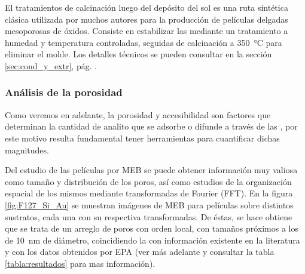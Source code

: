 	 		El tratamientos de calcinación luego del depósito del sol es una ruta sintética clásica utilizada por muchos autores para la producción de películas delgadas mesoporosas de óxidos\cite{Soler-Illia2002a,Brinker1999,Soler-Illia2006,Grosso2004,Innocenzi2013,angelome2011}. Consiste en estabilizar las \pdm\space mediante un tratamiento a humedad y temperatura controladas, seguidas de calcinación a \SI{350}{\celsius} para eliminar el molde. Los detalles técnicos se pueden consultar en la sección \ref{sec:cond_y_extr}, pág. \pageref{sec:cond_y_extr}.

	 	  \subsubsection{Análisis de la porosidad}

		 Como veremos en adelante, la porosidad y accesibilidad son factores que determinan la cantidad de analito que se adsorbe o difunde a través de las \pdm, por este motivo resulta fundamental tener herramientas para cuantificar dichas magnitudes. 

		 Del estudio de las películas por MEB se puede obtener información muy valiosa como tamaño y distribución de los poros, así como estudios de la organización espacial de los mismos mediante transformadas de Fourier (FFT). En la figura \ref{fig:F127_Si_Au} se muestran imágenes de MEB para películas \pdmF sobre distintos sustratos, cada una con su respectiva transformadas. De éstas, se hace obtiene que se trata de un arreglo de poros con orden local, con tamaños próximos a los de \SI{10}{\nm} de diámetro, coincidiendo la con información existente en la literatura\cite{urade2005,angelome2011,lee2006} y con los datos obtenidos por EPA (ver más adelante y consultar la tabla \ref{tabla:resultados} para mas información).  

